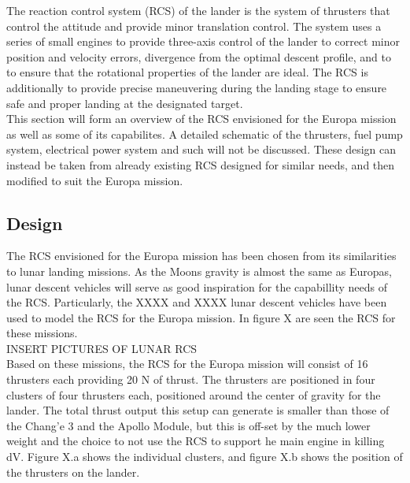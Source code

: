 \label{chap:RCS}

The reaction control system (RCS) of the lander is the system of thrusters that control the attitude and provide minor translation control. The system uses a series of small engines to provide three-axis control of the lander to correct minor position and velocity errors, divergence from the optimal descent profile, and to to ensure that the rotational properties of the lander are ideal. The RCS is additionally to provide precise maneuvering during the landing stage to ensure safe and proper landing at the designated target.\\

This section will form an overview of the RCS envisioned for the Europa mission as well as some of its capabilites. A detailed schematic of the thrusters, fuel pump system, electrical power system and such will not be discussed. These design can instead be taken from already existing RCS designed for similar needs, and then modified to suit the Europa mission.\\

\subsection{Design}

The RCS envisioned for the Europa mission has been chosen from its similarities to lunar landing missions. As the Moons gravity is almost the same as Europas, lunar descent vehicles  will serve as good inspiration for the capabillity needs of the RCS. Particularly, the XXXX and XXXX lunar descent vehicles have been used to model the RCS for the Europa mission. In figure X are seen the RCS for these missions.\\


					INSERT PICTURES OF LUNAR RCS\\


Based on these missions, the RCS for the Europa mission will consist of 16 thrusters each providing 20 N of thrust. The thrusters are positioned in four clusters of four thrusters each, positioned around the center of gravity for the lander. The total thrust output this setup can generate is smaller than those of the Chang'e 3 and the Apollo Module, but this is off-set  by the much lower weight and the choice to not use the RCS to support he main engine in killing dV. Figure X.a shows the individual clusters, and figure X.b shows the position of the thrusters on the lander.\\

